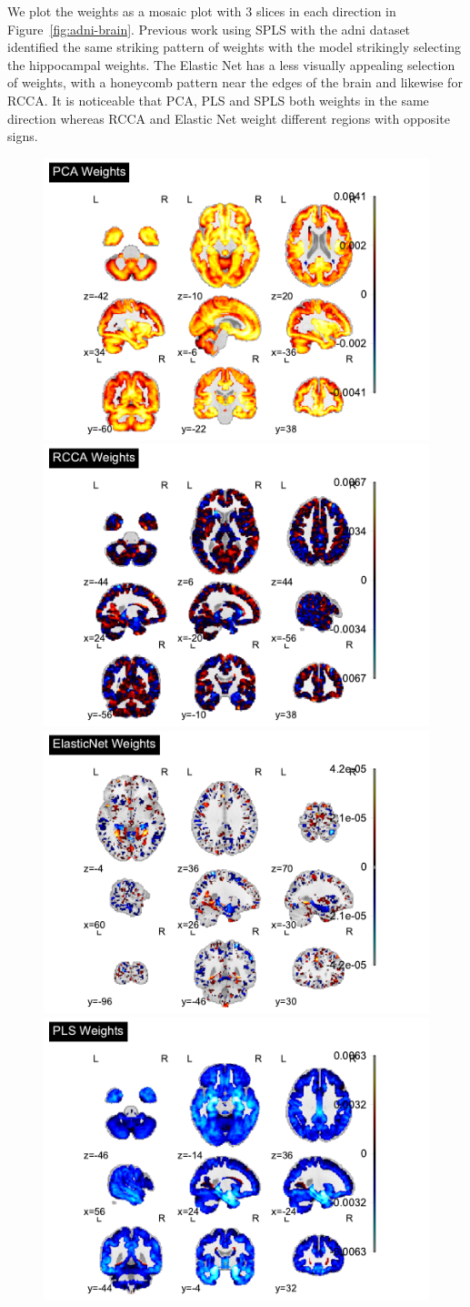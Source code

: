 We plot the \gls{weights} as a mosaic plot with 3 slices in each direction in Figure~\ref{fig:adni-brain}.
Previous work using SPLS with the \acrshort{adni} dataset identified the same striking pattern of \gls{weights} with the model strikingly selecting the hippocampal weights\cite{monteiro2016multiple}.
The Elastic Net has a less visually appealing selection of weights, with a honeycomb pattern near the edges of the brain and likewise for RCCA.
It is noticeable that PCA, PLS and SPLS both \gls{weights} in the same direction whereas RCCA and Elastic Net weight different regions with opposite signs.

\begin{figure}
    \centering
    \includegraphics[width=0.45\linewidth]{figures/adni/PCA brain weights mosaic}
    \includegraphics[width=0.45\linewidth]{figures/adni/RCCA brain weights mosaic}
    \includegraphics[width=0.45\linewidth]{figures/adni/ElasticNet brain weights mosaic}
    \includegraphics[width=0.45\linewidth]{figures/adni/PLS brain weights mosaic}

\end{figure}
